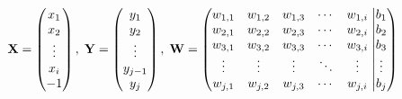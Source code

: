 \begin{equation}
    \mathbf{X} = \left(
        \begin{matrix}
            x_1 \\
            x_2 \\
            \vdots \\
            x_i \\
            -1
        \end{matrix}
    \right),\; 
    \mathbf{Y} = \left(
        \begin{matrix}
            y_1 \\
            y_2 \\
            \vdots \\
            y_{j-1} \\
            y_j
        \end{matrix}
    \right),\;\mathbf{W}=
    \left(
        \begin{matrix}
            w_{1,1} & w_{1,2} & w_{1,3} & \cdots & w_{1,i} \\
            w_{2,1} & w_{2,2} & w_{2,3} & \cdots & w_{2,i} \\
            w_{3,1} & w_{3,2} & w_{3,3} & \cdots & w_{3,i} \\
            \vdots  & \vdots  & \vdots  & \ddots & \vdots  \\
            w_{j,1} & w_{j,2} & w_{j,3} & \cdots & w_{j,i} 
        \end{matrix}
    \right. \left|
        \begin{matrix}
            b_1 \\
            b_2 \\
            b_3 \\
            \vdots \\
            b_j
        \end{matrix}
    \right)
    \label{fc:clarify}
\end{equation}

